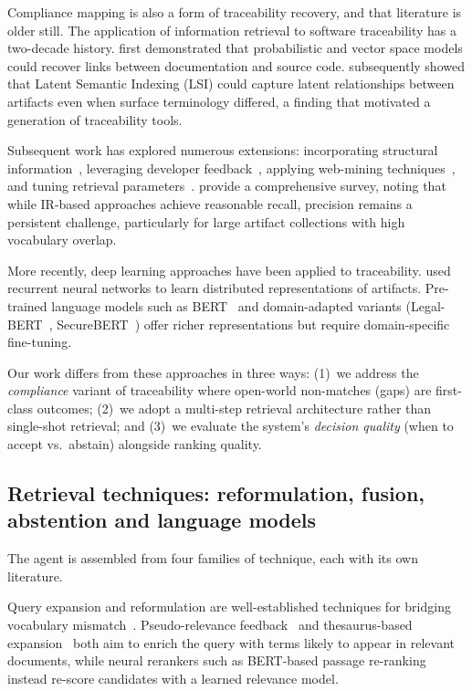 \documentclass[a4paper,fleqn]{cas-sc}
\begin{document}
Compliance mapping is also a form of traceability recovery, and that literature is older still.
The application of information retrieval to software traceability has a two-decade history.
\citet{Antoniol2002} first demonstrated that probabilistic and vector space models could recover links between documentation and source code.
\citet{MarcusMaletic2003} subsequently showed that Latent Semantic Indexing (LSI) could capture latent relationships between artifacts even when surface terminology differed, a finding that motivated a generation of traceability tools.

Subsequent work has explored numerous extensions: incorporating structural information~\citep{McMillan2009}, leveraging developer feedback~\citep{Cuddeback2010}, applying web-mining techniques~\citep{Ali2013}, and tuning retrieval parameters~\citep{Oliveto2010}.
\citet{Borg2014} provide a comprehensive survey, noting that while IR-based approaches achieve reasonable recall, precision remains a persistent challenge, particularly for large artifact collections with high vocabulary overlap.

More recently, deep learning approaches have been applied to traceability.
\citet{Guo2017} used recurrent neural networks to learn distributed representations of artifacts.
Pre-trained language models such as BERT~\citep{Devlin2019} and domain-adapted variants (Legal-BERT~\citep{Chalkidis2020}, SecureBERT~\citep{Aghaei2022}) offer richer representations but require domain-specific fine-tuning.

Our work differs from these approaches in three ways: (1)~we address the \emph{compliance} variant of traceability where open-world non-matches (gaps) are first-class outcomes; (2)~we adopt a multi-step retrieval architecture rather than single-shot retrieval; and (3)~we evaluate the system's \emph{decision quality} (when to accept vs.\ abstain) alongside ranking quality.

\subsection{Retrieval techniques: reformulation, fusion, abstention and language models}
\label{sec:related-methods}

The agent is assembled from four families of technique, each with its own literature.

Query expansion and reformulation are well-established techniques for bridging vocabulary mismatch~\citep{Carpineto2012}.
Pseudo-relevance feedback~\citep{Rocchio1971} and thesaurus-based expansion~\citep{Voorhees1994} both aim to enrich the query with terms likely to appear in relevant documents, while neural rerankers such as BERT-based passage re-ranking~\citep{Nogueira2019} instead re-score candidates with a learned relevance model.
\end{document}
